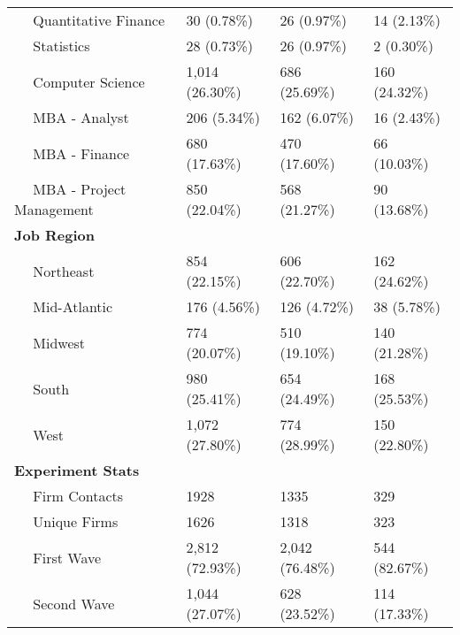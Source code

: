 \begin{tabular}{llll}
~~ Quantitative Finance & 30 (0.78\%) & 26 (0.97\%) & 14 (2.13\%)\\
\addlinespace
~~ Statistics & 28 (0.73\%) & 26 (0.97\%) & 2 (0.30\%)\\
~~ Computer Science & 1,014 (26.30\%) & 686 (25.69\%) & 160 (24.32\%)\\
~~ MBA - Analyst & 206 (5.34\%) & 162 (6.07\%) & 16 (2.43\%)\\
~~ MBA - Finance & 680 (17.63\%) & 470 (17.60\%) & 66 (10.03\%)\\
~~ MBA - Project Management & 850 (22.04\%) & 568 (21.27\%) & 90 (13.68\%)\\
\addlinespace
\bf{Job Region} & ~ & ~ & ~\\
~~ Northeast & 854 (22.15\%) & 606 (22.70\%) & 162 (24.62\%)\\
~~ Mid-Atlantic & 176 (4.56\%) & 126 (4.72\%) & 38 (5.78\%)\\
~~ Midwest & 774 (20.07\%) & 510 (19.10\%) & 140 (21.28\%)\\
~~ South & 980 (25.41\%) & 654 (24.49\%) & 168 (25.53\%)\\
\addlinespace
~~ West & 1,072 (27.80\%) & 774 (28.99\%) & 150 (22.80\%)\\
\bf{Experiment Stats} & ~ & ~ & ~\\
~~ Firm Contacts & 1928 & 1335 & 329\\
~~ Unique Firms & 1626 & 1318 & 323\\
~~ First Wave & 2,812 (72.93\%) & 2,042 (76.48\%) & 544 (82.67\%)\\
~~ Second Wave & 1,044 (27.07\%) & 628 (23.52\%) & 114 (17.33\%)\\
\bottomrule
\end{tabular}
